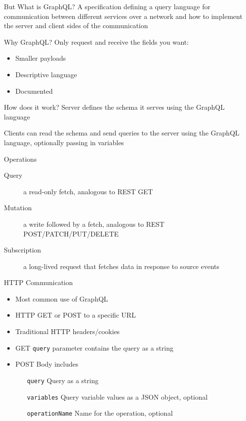 \documentclass[notes]{beamer}
\begin{document}
\begin{frame}{But What is GraphQL?}
  A specification defining a query language for communication between different services over a network and how to implement the server and client sides of the communication
\end{frame}


\begin{frame}{Why GraphQL?}
  Only request and receive the fields you want:
  \begin{itemize}
  \item Smaller payloads
  \item Descriptive language
  \item Documented
  \end{itemize}
\end{frame}


\begin{frame}{How does it work?}
  Server defines the schema it serves using the GraphQL language

  Clients can read the schema and send queries to the server using the GraphQL language, optionally passing in variables
\end{frame}


\begin{frame}{Operations}
  \begin{description}
    \item[Query] a read-only fetch, analogous to REST GET
    \item[Mutation] a write followed by a fetch, analogous to REST POST/PATCH/PUT/DELETE
    \item[Subscription] a long-lived request that fetches data in response to source events
  \end{description}
\end{frame}


\begin{frame}{HTTP Communication}
  \begin{itemize}
  \item Most common use of GraphQL
  \item HTTP GET or POST to a specific URL
  \item Traditional HTTP headers/cookies
  \item GET \texttt{query} parameter contains the query as a string
  \item POST Body includes
    \begin{itemize}
    \item[\texttt{query}] Query as a string
    \item[\texttt{variables}] Query variable values as a JSON object, optional
    \item[\texttt{operationName}] Name for the operation, optional
    \end{itemize}
  \end{itemize}
\end{frame}
\end{document}
